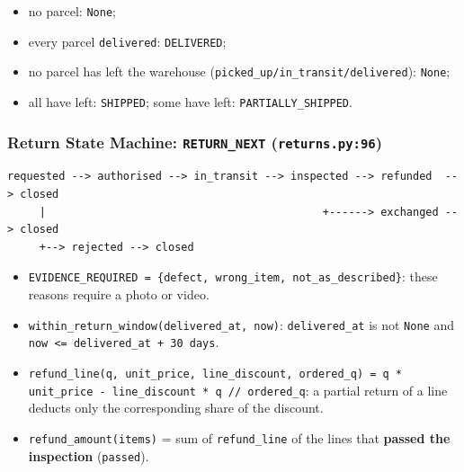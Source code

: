 \begin{itemize}
\tightlist
\item
  no parcel: \texttt{None};
\item
  every parcel \texttt{delivered}: \texttt{DELIVERED};
\item
  no parcel has left the warehouse
  (\texttt{picked\_\allowbreak{}up/\allowbreak{}in\_\allowbreak{}transit/\allowbreak{}delivered}): \texttt{None};
\item
  all have left: \texttt{SHIPPED}; some have left:
  \texttt{PARTIALLY\_\allowbreak{}SHIPPED}.
\end{itemize}

\hypertarget{return-state-machine-return_next-returns.py96}{%
\subsubsection{\texorpdfstring{Return State Machine:
\texttt{RETURN\_\allowbreak{}NEXT}
(\texttt{returns.\allowbreak{}py:96})}{Return State Machine: RETURN\_NEXT (returns.py:96)}}\label{return-state-machine-return_next-returns.py96}}

\begin{lstlisting}[numbers=none]
requested --> authorised --> in_transit --> inspected --> refunded  --> closed
     |                                           +------> exchanged --> closed
     +--> rejected --> closed
\end{lstlisting}

\begin{itemize}
\tightlist
\item
  \texttt{EVIDENCE\_\allowbreak{}REQUIRED =\allowbreak{} \{defect,\allowbreak{} wrong\_\allowbreak{}item,\allowbreak{} not\_\allowbreak{}as\_\allowbreak{}described\}}:
  these reasons require a photo or video.
\item
  \texttt{within\_\allowbreak{}return\_\allowbreak{}window(\allowbreak{}delivered\_\allowbreak{}at,\allowbreak{} now)}:
  \texttt{delivered\_\allowbreak{}at} is not \texttt{None} and
  \texttt{now \textless{}=\allowbreak{} delivered\_\allowbreak{}at + 30 days}.
\item
  \texttt{refund\_\allowbreak{}line(\allowbreak{}q,\allowbreak{} unit\_\allowbreak{}price,\allowbreak{} line\_\allowbreak{}discount,\allowbreak{} ordered\_\allowbreak{}q) =\allowbreak{} q * unit\_\allowbreak{}price - line\_\allowbreak{}discount * q /\allowbreak{}/\allowbreak{} ordered\_\allowbreak{}q}:
  a partial return of a line deducts only the corresponding share of the
  discount.
\item
  \texttt{refund\_\allowbreak{}amount(\allowbreak{}items)} = sum of \texttt{refund\_\allowbreak{}line} of the
  lines that \textbf{passed the inspection} (\texttt{passed}).
\end{itemize}

